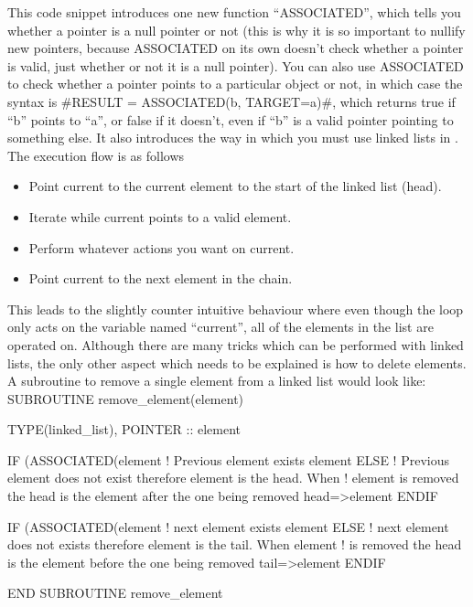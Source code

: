 \documentclass[12pt,a4paper]{article}
\newcommand{\EPOCH}{{\color{warwickdark}\fontfamily{phv}\selectfont{EPOCH}}}
\newenvironment{boxverbatim}{\lboxverbatim{none}}{\endlboxverbatim}
\begin{document}
This code snippet introduces one new function ``ASSOCIATED'', which tells you
whether a pointer is a null pointer or not (this is why it is so important to
nullify new pointers, because ASSOCIATED on its own doesn't check whether a
pointer is valid, just whether or not it is a null pointer). You can also use
ASSOCIATED to check whether a pointer points to a particular object or not, in
which case the syntax is #RESULT = ASSOCIATED(b, TARGET=a)#, which
returns true if ``b'' points to ``a'', or false if it doesn't, even if ``b''
is a valid pointer pointing to something else. It also introduces the way in
which you must use linked lists in {\EPOCH}. The execution flow is as follows
\begin{itemize}
\item Point current to the current element to the start of the linked list
  (head).
\item Iterate while current points to a valid element.
\item Perform whatever actions you want on current.
\item Point current to the next element in the chain.
\end{itemize}
This leads to the slightly counter intuitive behaviour where even though the
loop only acts on the variable named ``current'', all of the elements in the
list are operated on. Although there are many tricks which can be performed
with linked lists, the only other aspect which needs to be explained is how
to delete elements. A subroutine to remove a single element from a linked list
would look like:
\begin{boxverbatim}
SUBROUTINE remove_element(element)

  TYPE(linked_list), POINTER :: element

  IF (ASSOCIATED(element%
    ! Previous element exists
    element%
  ELSE
    ! Previous element does not exist therefore element is the head. When
    ! element is removed the head is the element after the one being removed
    head=>element%
  ENDIF

  IF (ASSOCIATED(element%
    ! next element exists
    element%
  ELSE
    ! next element does not exists therefore element is the tail. When element
    ! is removed the head is the element before the one being removed
    tail=>element%
  ENDIF

END SUBROUTINE remove_element
\end{boxverbatim}
\end{document}
